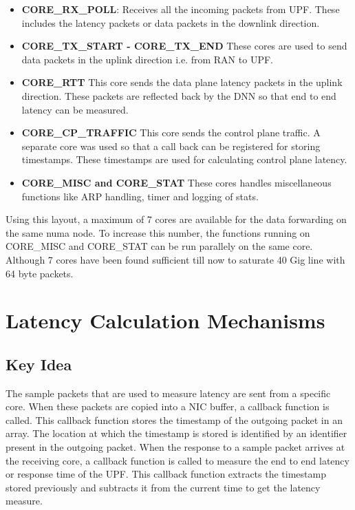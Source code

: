 \begin{itemize}
	\item \textbf{CORE\_RX\_POLL}: Receives all the incoming packets from UPF. These includes the latency packets or data packets in the downlink direction.
	\item \textbf{CORE\_TX\_START - CORE\_TX\_END}
	      These cores are used to send data packets in the uplink  direction i.e. from RAN to UPF.
	\item \textbf{CORE\_RTT}
	      This core sends the data plane latency packets in the uplink direction. These packets are reflected back by the DNN so that end to end latency can be measured.
	\item \textbf{CORE\_CP\_TRAFFIC} This core sends the control plane traffic. A separate core was used so that a call back can be registered for storing timestamps. These timestamps are used for calculating control plane latency.
	\item \textbf{CORE\_MISC and CORE\_STAT}
	      These cores handles miscellaneous functions like ARP handling, timer and logging of stats.
\end{itemize}
Using this layout, a maximum of 7 cores are available for the data forwarding on the same numa node.
To increase this number, the functions running on CORE\_MISC and CORE\_STAT can be run parallely on the same core. Although 7 cores have been found sufficient till now to saturate 40 Gig line with 64 byte packets.

\section{Latency Calculation Mechanisms}
\subsection{Key Idea \label{subsec:KeyIdeaCPL}}
The sample packets that are used to measure latency are sent from a specific core.
When these packets are copied into a NIC buffer, a callback function is called.
This callback function stores the timestamp of the outgoing packet in an array.
The location at which the timestamp is stored is identified by an identifier
present in the outgoing packet. When the  response to a sample packet arrives
at the receiving core, a callback function is called to measure the end to
end latency or response time of the UPF. This callback function extracts the
timestamp stored previously and subtracts it from the current time to get the latency measure.


